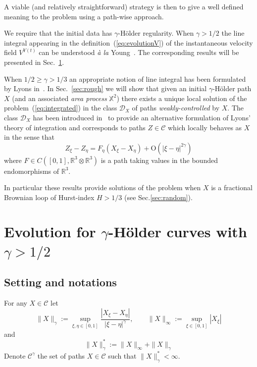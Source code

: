 \documentclass[a4paper,12pt,reqno]{amsart}
\newcommand{\norm}[1]{\|#1\|}
\newcommand{\RR}{\mathbb{R}^3}
\newcommand{\CC}{\mathscr{C}}
\newcommand{\DX}{\mathscr{D}_{X}}
\begin{document}
A viable (and relatively straightforward) strategy is then to give a well defined
meaning to the problem  using a path-wise approach. 

We require that the initial data has
$\gamma$-H\"older regularity. 
When $\gamma >
1/2$ the line integral appearing in the
definition~(\ref{eq:evolutionV}) of the instantaneous velocity field
$V^{Y(t)}$ can be understood \emph{\`a la} Young~\cite{young}. The
corresponding results will be presented in
Sec.~\ref{sec:young}. 

When $1/2 \ge  \gamma > 1/3$ an appropriate
notion of line integral has been formulated by Lyons
in~\cite{Lyons,LyonsBook}. In Sec.~\ref{sec:rough} we will show that
given an initial $\gamma$-H\"older path $X$ (and
an associated \emph{area process} $\mathbb{X}^2$) there exists a  unique local
solution of the problem~(\ref{eq:integrated}) in the class $\DX$ of paths
\emph{weakly-controlled} by $X$. The class $\DX$ has been introduced
in~\cite{Gubinelli} to provide an alternative formulation of Lyons' theory of
integration and corresponds to paths $Z \in \CC$ which locally behaves as
$X$ in the sense that
$$
Z_\xi - Z_\eta = F_\eta (X_\xi-X_\eta) + \text{O}(|\xi-\eta|^{2\gamma})
$$
where $F \in C([0,1],\RR \otimes \RR)$ is a path taking values in the
bounded endomorphisms of $\RR$.

In particular these results provide solutions of the problem when $X$
is a fractional Brownian loop of Hurst-index $H > 1/3$ (see Sec.\ref{sec:random}).


\section{Evolution for $\gamma$-H\"older curves with $\gamma > 1/2$}
\label{sec:young}

\subsection{Setting and notations}

For any $X \in \CC$ let
\begin{equation*}
  \|X\|_{\gamma} :=
\sup_{\xi,\eta\in[0,1]} \frac{|X_\xi-X_\eta|}{|\xi-\eta|^\gamma},
\qquad   \|X\|_{\infty} :=
\sup_{\xi \in[0,1]} |X_\xi|
\end{equation*}
and
\begin{equation*}
  \|X\|_{\gamma}^{*} := \norm{X}_{\infty}+
  \norm{X}_{\gamma}
\end{equation*}
Denote $\CC^\gamma$ the set of paths $X \in \CC$ such that
$\norm{X}_{\gamma}^*< \infty$.
\end{document}
